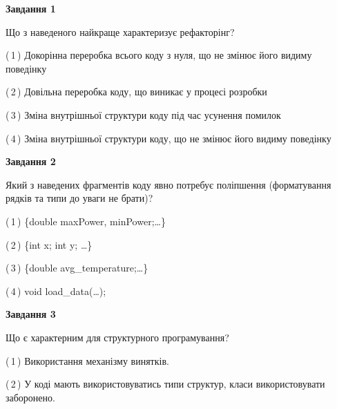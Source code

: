\documentclass[10pt, ukrainian]{article}
\begin{document}
{
\begin {large}
{\begin {center}\textbf{Завдання 1}\end {center}}\par
Що з наведеного найкраще характеризує рефакторінг?\par
\vspace{2mm}



(\,1\,) Докорінна переробка всього коду з нуля,  що не змінює його видиму поведінку%



(\,2\,) Довільна переробка коду, що виникає у процесі розробки%



(\,3\,) Зміна внутрішньої структури коду під час усунення помилок%



(\,4\,) Зміна внутрішньої структури коду, що не змінює його видиму поведінку%


{\begin {center}\textbf{Завдання 2}\end {center}}\par
Який з наведених фрагментів коду явно потребує поліпшення (форматування рядків та типи до уваги не брати)?\par
\vspace{2mm}



(\,1\,) \{double maxPower, minPower;…\} %



(\,2\,) \{int x; int y; …\}%



(\,3\,) \{double avg\_temperature;…\} %



(\,4\,) void load\_data(…);%


{\begin {center}\textbf{Завдання 3}\end {center}}\par
Що є характерним для структурного програмування?\par
\vspace{2mm}



(\,1\,) Використання механізму винятків. %



(\,2\,) У коді мають використовуватись типи структур, класи використовувати заборонено. %




\end{large}}
\end{document}
